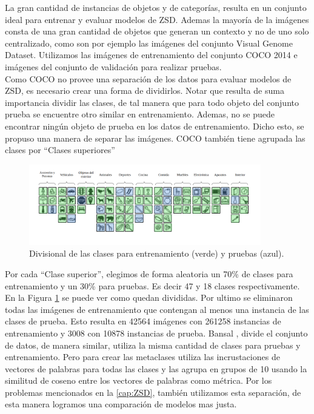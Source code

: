  La gran cantidad de instancias de objetos y de categorías, resulta en un conjunto ideal para entrenar y evaluar modelos de ZSD. Ademas la mayoría de la imágenes consta de una gran cantidad de objetos que generan un contexto y no de uno solo centralizado, como son por ejemplo las imágenes del conjunto Visual Genome Dataset. Utilizamos las imágenes de entrenamiento del conjunto COCO 2014 e imágenes del conjunto de validación para realizar pruebas.
\\
Como COCO no provee una separación de los datos para evaluar modelos de ZSD, es necesario crear una forma de dividirlos. Notar que resulta de suma importancia dividir las clases, de tal manera que para todo objeto del conjunto prueba se encuentre otro similar en entrenamiento. Ademas, no se puede encontrar ningún objeto de prueba en los datos de entrenamiento. Dicho esto, se propuso una manera de separar las imágenes. COCO también tiene agrupada las clases por ``Clases superiores''
\begin{figure}[H]
	\begin{center}
	\centering
	\includegraphics[width=0.9\textwidth]{img/data_set.png}
	\caption{Divisional de las clases para entrenamiento (verde) y pruebas (azul).}
	\label{fig:data_set}
	\end{center}	
\end{figure}
Por cada ``Clase superior'', elegimos de forma aleatoria un 70\% de clases para entrenamiento y un 30\% para pruebas. Es decir 47 y 18 clases respectivamente. En la Figura \ref{fig:data_set} se puede ver como quedan divididas. Por ultimo se eliminaron todas las imágenes de entrenamiento que contengan al menos una instancia de las clases de prueba. Esto resulta en 42564 imágenes con 261258 instancias de entrenamiento y 3008 con 10878 instancias de prueba. Bansal \cite{bansal2018zero}, divide el conjunto de datos, de manera similar, utiliza la misma cantidad de clases para pruebas y entrenamiento. Pero para crear las metaclases utiliza las incrustaciones de vectores de palabras para todas las clases y las agrupa en grupos de 10 usando la similitud de coseno entre los vectores de palabras como métrica. Por los problemas mencionados en la \autoref{cap:ZSD}, también utilizamos esta separación, de esta manera logramos una comparación de modelos mas justa.

